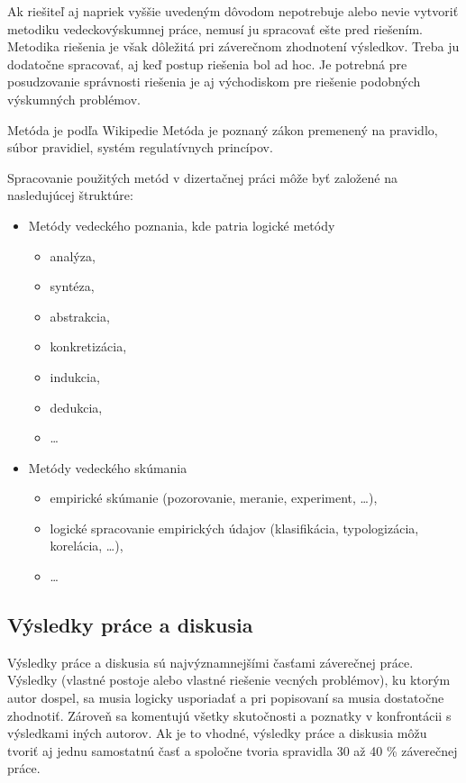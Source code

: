 Ak riešiteľ aj napriek vyššie uvedeným dôvodom nepotrebuje alebo nevie vytvoriť metodiku vedeckovýskumnej práce, nemusí ju spracovať ešte pred riešením.  Metodika riešenia je však dôležitá pri záverečnom zhodnotení výsledkov. Treba ju dodatočne spracovať, aj keď postup riešenia bol ad hoc. Je potrebná pre posudzovanie správnosti riešenia je aj východiskom pre riešenie podobných výskumných problémov.

Metóda je podľa Wikipedie Metóda je poznaný zákon premenený na pravidlo, súbor pravidiel, systém regulatívnych princípov.

Spracovanie použitých metód v dizertačnej práci môže byť založené na nasledujúcej štruktúre:

\begin{itemize}
	\item Metódy vedeckého poznania, kde patria logické metódy
	\begin{itemize}
		\item analýza,
		\item syntéza,
		\item abstrakcia,
		\item konkretizácia,
		\item indukcia,
		\item dedukcia,
		\item \dots
	\end{itemize}
	
	\item Metódy vedeckého skúmania
	\begin{itemize}
		\item empirické skúmanie (pozorovanie, meranie, experiment, \dots),
		\item logické spracovanie empirických údajov (klasifikácia, typologizácia, korelácia, \dots),
		\item \dots
	\end{itemize}
\end{itemize}

\subsection{Výsledky práce a diskusia}

Výsledky práce a diskusia sú najvýznamnejšími časťami záverečnej práce. Výsledky (vlastné postoje alebo vlastné riešenie vecných problémov), ku ktorým autor dospel, sa musia logicky usporiadať a pri popisovaní sa musia dostatočne zhodnotiť. Zároveň sa komentujú všetky skutočnosti a poznatky v konfrontácii s výsledkami iných autorov. Ak je to vhodné, výsledky práce a diskusia môžu tvoriť aj jednu samostatnú časť a spoločne tvoria spravidla 30 až 40 \% záverečnej práce.

